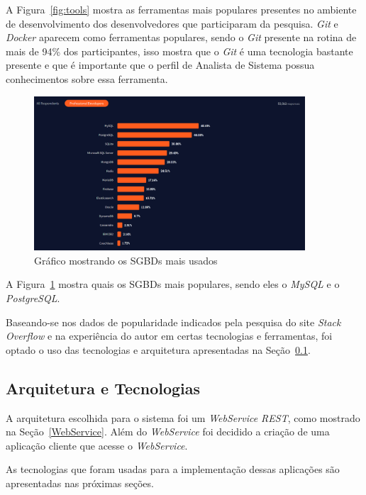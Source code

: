 \documentclass[12pt]{article}
\begin{document}
A Figura~\ref{fig:tools} mostra as ferramentas mais populares presentes no ambiente de desenvolvimento dos desenvolvedores
que participaram da pesquisa. \textit{Git} e \textit{Docker} aparecem como ferramentas populares, sendo o \textit{Git} presente
na rotina de mais de 94\% dos participantes, isso mostra que o \textit{Git} é uma tecnologia bastante presente e que é
importante que o perfil de Analista de Sistema possua conhecimentos sobre essa ferramenta.

\begin{figure}[h]
  \centering
  \includegraphics[width=0.9\textwidth]{stackoverflow/databases.png}
  \caption{Gráfico mostrando os SGBDs mais usados}\label{fig:databases}
\end{figure}

A Figura~\ref{fig:databases} mostra quais os SGBDs mais populares, sendo eles o \textit{MySQL} e o \textit{PostgreSQL}.

Baseando-se nos dados de popularidade indicados pela pesquisa do site \textit{Stack Overflow} e na experiência do autor em certas tecnologias e ferramentas,
foi optado o uso das tecnologias e arquitetura apresentadas na Seção~\ref{ArquiteturaTecnologias}.

\subsection{Arquitetura e Tecnologias}\label{ArquiteturaTecnologias}

A arquitetura escolhida para o sistema foi um \textit{WebService REST}, como mostrado na Seção~\ref{WebService}.
Além do \textit{WebService} foi decidido a criação de uma aplicação cliente que acesse o \textit{WebService}.

As tecnologias que foram usadas para a implementação dessas aplicações são apresentadas nas próximas seções.
\end{document}
